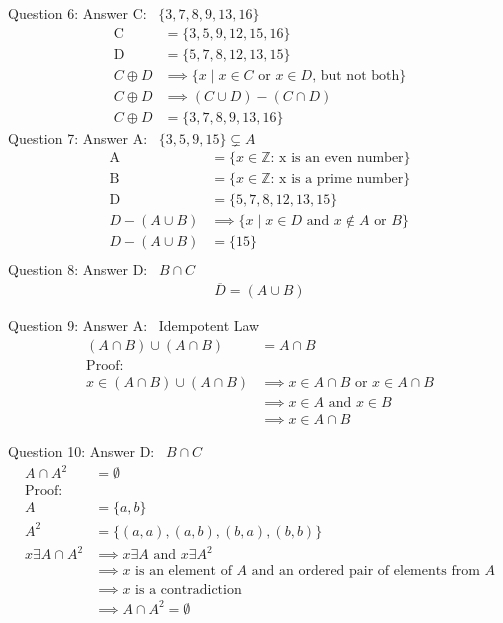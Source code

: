 \documentclass{article}
\begin{document}
Question 6:   Answer C: \ $\{3, 7, 8, 9, 13, 16 \}$
\begin{align}
    \text{C\ } & = \{ 3, 5, 9, 12, 15, 16 \}  \\
    \text{D\ } & = \{ 5, 7, 8, 12, 13, 15 \} \\
    C \oplus D & \implies \{ x \mid x \in C \text{ or } x \in D \text{, but not both} \}  \\
    C \oplus D & \implies (C \cup D) - (C \cap D) \\
    C \oplus D & = \{ 3, 7, 8, 9, 13, 16 \} 
\end{align}
Question 7:   Answer A: \ $\{3, 5, 9, 15 \} \subsetneq A$
\begin{align}
    \text{A\ } & = \{ x \in \mathbb{Z} \text{: x is an even number} \}  \\
    \text{B\ } & = \{ x \in \mathbb{Z} \text{: x is a prime number} \}  \\
    \text{D\ } & = \{ 5, 7, 8, 12, 13, 15 \} \\
     D - (A \cup B) & \implies \{ x \mid x \in D \text{ and } x \notin A \text{ or } B \} \\
     D - (A \cup B) & = \{ 15 \}  \\
\end{align}
Question 8:   Answer D: \ $ B \cap C$
\begin{align}
    \overline{D} = (A \cup B) 
\end{align}

Question 9:   Answer A: \ Idempotent Law
\begin{align}
    (A \cap B) \cup (A \cap B) &= A \cap B \\
\text{Proof:} \\
x \in (A \cap B) \cup (A \cap B) &\implies x \in A \cap B \text{ or } x \in A \cap B \\
&\implies x \in A \text{ and } x \in B \\
&\implies x \in A \cap B 
\end{align}

Question 10:   Answer D: \ $ B \cap C$
\begin{align}
A \cap A^2 &= \emptyset \\
\text{Proof:} \\
A &= \{a, b\} \\
A^2 &= \{(a, a), (a, b), (b, a), (b, b)\} \\
x \exists A \cap A^2 &\implies x \exists A \text{ and } x \exists A^2 \\
&\implies x \text{ is an element of } A \text{ and an ordered pair of elements from } A \\
&\implies x \text{ is a contradiction} \\
&\implies A \cap A^2 = \emptyset \\
\end{align}
\end{document}
